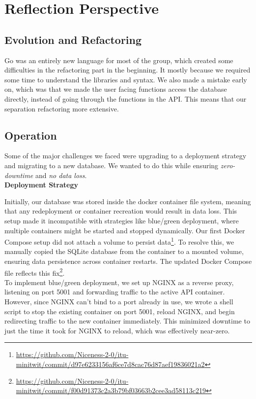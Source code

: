 \section{Reflection Perspective}
\subsection{Evolution and Refactoring}

Go was an entirely new language for most of the group, which created some difficulties in the refactoring part in the beginning. It mostly because we required some time to understand the libraries and syntax. 
We also made a mistake early on, which was that we made the user facing functions access the database directly, instead of going through the functions in the API. This means that our separation refactoring more extensive.


\subsection{Operation}
Some of the major challenges we faced were upgrading to a deployment strategy and migrating to a new database. We wanted to do this while ensuring \textit{zero-downtime} and \textit{no data loss}.
\\

\noindent \textbf{Deployment Strategy}

Initially, our database was stored inside the docker container file system, meaning that any redeployment or container recreation would result in data loss. This setup made it incompatible with strategies like blue/green deployment, where multiple containers might be started and stopped dynamically. Our first Docker Compose setup did not attach a volume to persist data\footnote{\url{https://github.com/Niceness-2-0/itu-minitwit/commit/d97e6233156af6ce7d8cac76d87aef19836021a2}}. To resolve this, we manually copied the SQLite database from the container to a mounted volume, ensuring data persistence across container restarts. The updated Docker Compose file reflects this fix\footnote{\url{https://github.com/Niceness-2-0/itu-minitwit/commit/f00d91373c2a3b79bf03663b2cee3ad58113c219}}.
\\

To implement blue/green deployment, we set up NGINX as a reverse proxy, listening on port 5001 and forwarding traffic to the active API container. However, since NGINX can't bind to a port already in use, we wrote a shell script to stop the existing container on port 5001, reload NGINX, and begin redirecting traffic to the new container immediately. This minimized downtime to just the time it took for NGINX to reload, which was effectively near-zero.
\\


